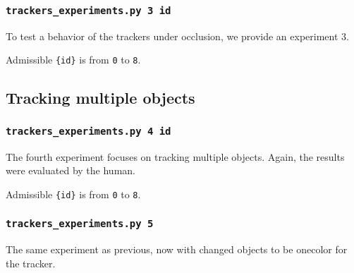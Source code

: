\subsubsection*{\texttt{trackers{\_}experiments.py 3 {id}}}

To test a behavior of the trackers under occlusion, we provide an experiment 3.

Admissible \verb+{id}+ is from \verb+0+ to \verb+8+.

\subsection*{Tracking multiple objects}

\subsubsection*{\texttt{trackers{\_}experiments.py 4 {id}}}

The fourth experiment focuses on tracking multiple objects. Again, the results were
evaluated by the human. 

Admissible \verb+{id}+ is from \verb+0+ to \verb+8+.

\subsubsection*{\texttt{trackers{\_}experiments.py 5}}

The same experiment as previous, now with changed objects to be onecolor for
the \hsv{} tracker.

